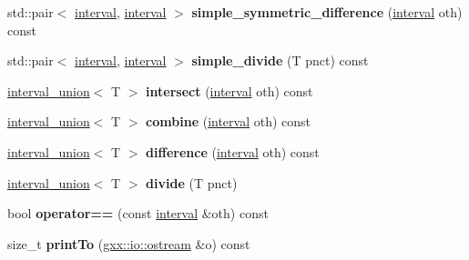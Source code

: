 \begin{DoxyCompactItemize}
\item 
std\+::pair$<$ \hyperlink{classgxx_1_1math_1_1interval}{interval}, \hyperlink{classgxx_1_1math_1_1interval}{interval} $>$ {\bfseries simple\+\_\+symmetric\+\_\+difference} (\hyperlink{classgxx_1_1math_1_1interval}{interval} oth) const \hypertarget{classgxx_1_1math_1_1interval_ae48bb2d429ed5a8c1d31672d9d60b441}{}\label{classgxx_1_1math_1_1interval_ae48bb2d429ed5a8c1d31672d9d60b441}

\item 
std\+::pair$<$ \hyperlink{classgxx_1_1math_1_1interval}{interval}, \hyperlink{classgxx_1_1math_1_1interval}{interval} $>$ {\bfseries simple\+\_\+divide} (T pnct) const \hypertarget{classgxx_1_1math_1_1interval_aae3e5dc4f049adeb7adb550edfe9be07}{}\label{classgxx_1_1math_1_1interval_aae3e5dc4f049adeb7adb550edfe9be07}

\item 
\hyperlink{structgxx_1_1math_1_1interval__union}{interval\+\_\+union}$<$ T $>$ {\bfseries intersect} (\hyperlink{classgxx_1_1math_1_1interval}{interval} oth) const \hypertarget{classgxx_1_1math_1_1interval_a7913e5365c84e1ff11ff69b568ca6c65}{}\label{classgxx_1_1math_1_1interval_a7913e5365c84e1ff11ff69b568ca6c65}

\item 
\hyperlink{structgxx_1_1math_1_1interval__union}{interval\+\_\+union}$<$ T $>$ {\bfseries combine} (\hyperlink{classgxx_1_1math_1_1interval}{interval} oth) const \hypertarget{classgxx_1_1math_1_1interval_a0ab7609307891aa9cee19b21db6aaedb}{}\label{classgxx_1_1math_1_1interval_a0ab7609307891aa9cee19b21db6aaedb}

\item 
\hyperlink{structgxx_1_1math_1_1interval__union}{interval\+\_\+union}$<$ T $>$ {\bfseries difference} (\hyperlink{classgxx_1_1math_1_1interval}{interval} oth) const \hypertarget{classgxx_1_1math_1_1interval_acdf3734ef67ad75b3a4f4e863afc18a8}{}\label{classgxx_1_1math_1_1interval_acdf3734ef67ad75b3a4f4e863afc18a8}

\item 
\hyperlink{structgxx_1_1math_1_1interval__union}{interval\+\_\+union}$<$ T $>$ {\bfseries divide} (T pnct)\hypertarget{classgxx_1_1math_1_1interval_ab133e971845d9782bc79d9824edffbd5}{}\label{classgxx_1_1math_1_1interval_ab133e971845d9782bc79d9824edffbd5}

\item 
bool {\bfseries operator==} (const \hyperlink{classgxx_1_1math_1_1interval}{interval} \&oth) const \hypertarget{classgxx_1_1math_1_1interval_a531c2924e790b0b7f09af12fa04bf962}{}\label{classgxx_1_1math_1_1interval_a531c2924e790b0b7f09af12fa04bf962}

\item 
size\+\_\+t {\bfseries print\+To} (\hyperlink{classgxx_1_1io_1_1ostream}{gxx\+::io\+::ostream} \&o) const \hypertarget{classgxx_1_1math_1_1interval_a9817cc9dc5ab9d7b0906546fc5c5af9a}{}\label{classgxx_1_1math_1_1interval_a9817cc9dc5ab9d7b0906546fc5c5af9a}

\end{DoxyCompactItemize}
